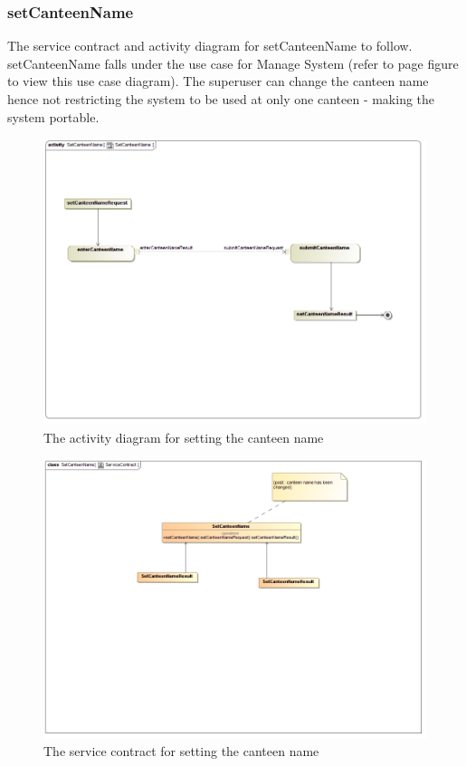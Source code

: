 \documentclass[a4paper,12pt]{article}
\begin{document}
\subsubsection{setCanteenName}
The service contract and activity diagram for setCanteenName to follow. setCanteenName falls under the use case for Manage System (refer to page   figure   to view this use case diagram). The superuser can change the canteen name hence not restricting the system to be used at only one canteen - making the system portable. 
\begin{figure}[H]
  \centering
    \includegraphics[width=1.0\textwidth]{../images/SetCanteenNameActivity.png}
    \caption{The activity diagram for setting the canteen name} 
\end{figure}

\begin{figure}[H]
	\centering
	\includegraphics[width=1.0\textwidth]{../images/SetCanteenServiceContract.png}
	\caption{The service contract for setting the canteen name}
\end{figure}
\end{document}
